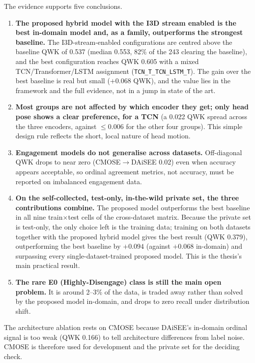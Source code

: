 \documentclass[../main.tex]{subfiles}
\begin{document}
The evidence supports five conclusions.
\begin{enumerate}
  \item \textbf{The proposed hybrid model with the I3D stream enabled is the best in-domain model and, as a family, outperforms the strongest baseline.}
  The I3D-stream-enabled configurations are centred above the baseline QWK of 0.537 (median 0.553, 82\% of the 243 clearing the baseline), and the best configuration reaches QWK 0.605 with a mixed TCN/Transformer/LSTM assignment (\texttt{TCN\_T\_TCN\_LSTM\_T}). The gain over the best baseline is real but small ($+0.068$ QWK), and the value lies in the framework and the full evidence, not in a jump in state of the art.
  \item \textbf{Most groups are not affected by which encoder they get; only head pose shows a clear preference, for a TCN} (a 0.022 QWK spread across the three encoders, against $\le0.006$ for the other four groups). This simple design rule reflects the short, local nature of head motion.
  \item \textbf{Engagement models do not generalise across datasets.}
  Off-diagonal QWK drops to near zero (CMOSE$\rightarrow$DAiSEE 0.02) even when accuracy appears acceptable, so ordinal agreement metrics, not accuracy, must be reported on imbalanced engagement data.
  \item \textbf{On the self-collected, test-only, in-the-wild private set, the three contributions combine.}
  The proposed model outperforms the best baseline in all nine train$\times$test cells of the cross-dataset matrix. Because the private set is test-only, the only choice left is the training data; training on both datasets together with the proposed hybrid model gives the best result (QWK 0.379), outperforming the best baseline by $+0.094$ (against $+0.068$ in-domain) and surpassing every single-dataset-trained proposed model. This is the thesis's main practical result.
  \item \textbf{The rare E0 (Highly\nobreakdash-Disengage) class is still the main open problem.}
  It is around 2--3\% of the data, is traded away rather than solved by the proposed model in-domain, and drops to zero recall under distribution shift.
\end{enumerate}

The architecture ablation rests on CMOSE because DAiSEE's in-domain ordinal signal is too weak (QWK 0.166) to tell architecture differences from label noise. CMOSE is therefore used for development and the private set for the deciding check.
\end{document}
